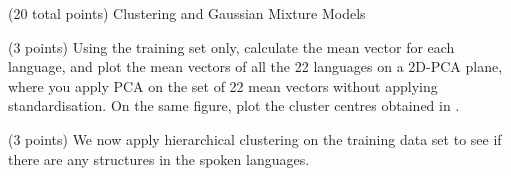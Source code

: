 \documentclass[12pt]{article}
\begin{document}
\begin{question}{(20 total points) Clustering and Gaussian Mixture Models}
\begin{subquestion}
\begin{answerbox}{35em}
      \end{answerbox}
  


   \end{subquestion}
   \begin{subquestion}{(3 points)
       Using the training set only,
       calculate the mean vector for each language, and plot the mean
       vectors of all the 22 languages on a 2D-PCA plane, where you
       apply PCA on the set of 22 mean vectors without applying
       standardisation.  
       On the same figure, plot the cluster centres obtained in .
     } \label{Q3.2}

   

  


   \end{subquestion}
   \begin{subquestion}{(3 points)
       We now apply hierarchical clustering on the training data set
       to see if there are any structures in the spoken languages.
     } \label{Q3.3}



\end{subquestion}
\end{question}
\end{document}
